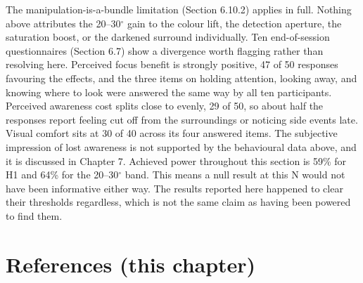 The manipulation-is-a-bundle limitation (Section 6.10.2) applies in full. Nothing above attributes the
20–30$^{\circ}$ gain to the colour lift, the detection aperture, the saturation boost, or the darkened
surround individually. Ten end-of-session questionnaires (Section 6.7) show a divergence worth
flagging rather than resolving here. Perceived focus benefit is strongly positive, 47 of 50 responses
favouring the effects, and the three items on holding attention, looking away, and knowing where to
look were answered the same way by all ten participants. Perceived awareness cost splits close to
evenly, 29 of 50, so about half the responses report feeling cut off from the surroundings or
noticing side events late. Visual comfort sits at 30 of 40 across its four answered items. The
subjective impression of lost awareness is not supported by the behavioural data above, and it is
discussed in Chapter 7. Achieved power throughout this section is 59\% for H1 and 64\% for
the 20–30$^{\circ}$ band. This means a null result at this N would not have been informative either
way. The results reported here happened to clear their thresholds regardless, which is not the same
claim as having been powered to find them.

\section*{References (this chapter)}






